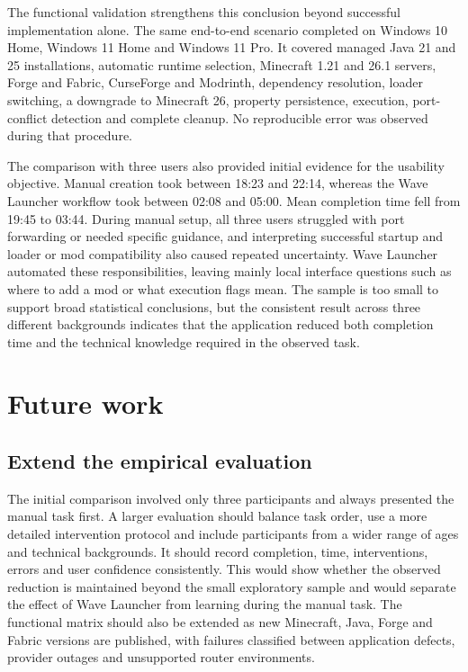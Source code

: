 The functional validation strengthens this conclusion beyond successful implementation alone. The same end-to-end scenario completed on Windows 10 Home, Windows 11 Home and Windows 11 Pro. It covered managed Java 21 and 25 installations, automatic runtime selection, Minecraft 1.21 and 26.1 servers, Forge and Fabric, CurseForge and Modrinth, dependency resolution, loader switching, a downgrade to Minecraft 26, property persistence, execution, port-conflict detection and complete cleanup. No reproducible error was observed during that procedure.

The comparison with three users also provided initial evidence for the usability objective. Manual creation took between 18:23 and 22:14, whereas the Wave Launcher workflow took between 02:08 and 05:00. Mean completion time fell from 19:45 to 03:44. During manual setup, all three users struggled with port forwarding or needed specific guidance, and interpreting successful startup and loader or mod compatibility also caused repeated uncertainty. Wave Launcher automated these responsibilities, leaving mainly local interface questions such as where to add a mod or what execution flags mean. The sample is too small to support broad statistical conclusions, but the consistent result across three different backgrounds indicates that the application reduced both completion time and the technical knowledge required in the observed task.

\section{Future work}

\subsection{Extend the empirical evaluation}

The initial comparison involved only three participants and always presented the manual task first. A larger evaluation should balance task order, use a more detailed intervention protocol and include participants from a wider range of ages and technical backgrounds. It should record completion, time, interventions, errors and user confidence consistently. This would show whether the observed reduction is maintained beyond the small exploratory sample and would separate the effect of Wave Launcher from learning during the manual task. The functional matrix should also be extended as new Minecraft, Java, Forge and Fabric versions are published, with failures classified between application defects, provider outages and unsupported router environments.

